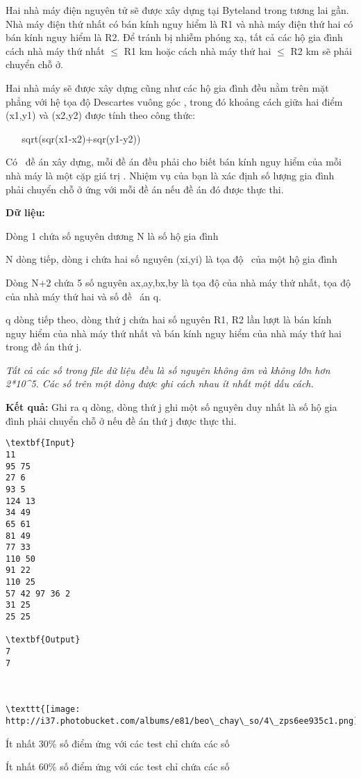 

Hai nhà máy điện nguyên tử sẽ được xây dựng tại Byteland trong tương lai gần. Nhà máy điện thứ nhất có bán kính nguy hiểm là R1 và nhà máy điện thứ hai có bán kính nguy hiểm là R2. Để tránh bị nhiễm phóng xạ, tất cả các hộ gia đình cách nhà máy thứ nhất  $\le$ R1 km hoặc cách nhà máy thứ hai  $\le$ R2 km sẽ phải chuyển chỗ ở.

Hai nhà máy sẽ được xây dựng cũng như các hộ gia đình đều nằm trên mặt phẳng với hệ tọa độ Descartes vuông góc , trong đó khoảng cách giữa hai điểm (x1,y1) và (x2,y2) được tính theo công thức:

    sqrt(sqr(x1-x2)+sqr(y1-y2))

Có  đề án xây dựng, mỗi đề án đều phải cho biết bán kính nguy hiểm của mỗi nhà máy là một cặp giá trị . Nhiệm vụ của bạn là xác định số lượng gia đình phải chuyển chỗ ở ứng với mỗi đề án nếu đề án đó được thực thi.

\textbf{Dữ liệu:} 

Dòng 1 chứa số nguyên dương N là số hộ gia đình

N dòng tiếp, dòng i chứa hai số nguyên (xi,yi) là tọa độ  của một hộ gia đình

Dòng N+2 chứa 5 số nguyên ax,ay,bx,by là tọa độ của nhà máy thứ nhất, tọa độ của nhà máy thứ hai và số đề  án q.

q dòng tiếp theo, dòng thứ j chứa hai số nguyên R1, R2 lần lượt là bán kính nguy hiểm của nhà máy thứ nhất và bán kính nguy hiểm của nhà máy thứ hai trong đề án thứ j.

\emph{Tất cả các số trong file dữ liệu đều là số nguyên không âm và không lớn hơn 2*10\textasciicircum5}\emph{. Các số trên một dòng được ghi cách nhau ít nhất một dấu cách.}

\textbf{Kết quả: }Ghi ra q dòng, dòng thứ j ghi một số nguyên duy nhất là số hộ gia đình phải chuyển chỗ ở nếu đề án thứ j được thực thi.
\begin{verbatim}
\textbf{Input}
11
95 75
27 6
93 5
124 13
34 49
65 61
81 49
77 33
110 50
91 22
110 25
57 42 97 36 2
31 25
25 25

\textbf{Output}
7
7



\texttt{[image: http://i37.photobucket.com/albums/e81/beo\_chay\_so/4\_zps6ee935c1.png]}\end{verbatim}

Ít nhất 30\% số điểm ứng với các test chỉ chứa các số

Ít nhất 60\% số điểm ứng với các test chỉ chứa các số 
